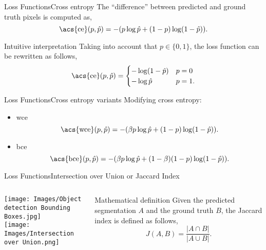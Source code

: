 \documentclass{beamer}
\begin{document}
\begin{frame}{Loss Functions}{Cross entropy}
  The ``difference'' between predicted and ground truth pixels is computed as,
  \begin{equation}
    \text{\acs{ce}}(p, \hat{p}) = -(p\log\hat{p} + (1 - p)\log(1 - \hat{p})).
  \end{equation}
  \begin{exampleblock}{Intuitive interpretation}
    Taking into account that \(p \in \{0, 1\}\), the loss function can be
    rewritten as follows,
    \begin{equation}
      \text{\acs{ce}}(p, \hat{p}) =
      \begin{cases}
        -\log(1 - \hat{p}) & p = 0 \\
        -\log\hat{p} & p = 1.
      \end{cases}
    \end{equation}
  \end{exampleblock}
\end{frame}

\begin{frame}{Loss Functions}{Cross entropy variants}
  Modifying cross entropy:
  \begin{itemize}
    \item \acf{wce}
    \begin{equation}
      \text{\acs{wce}}(p, \hat{p}) =
      -(\beta p\log\hat{p} + (1 - p)\log(1 - \hat{p})).
    \end{equation}
    \item \acf{bce}
    \begin{equation}
      \text{\acs{bce}}(p, \hat{p}) =
      -(\beta p\log\hat{p} + (1 - \beta)(1 - p)\log(1 - \hat{p})).
    \end{equation}
  \end{itemize}
\end{frame}

\begin{frame}{Loss Functions}{Intersection over Union or Jaccard Index}
  \begin{columns}
    \begin{column}{.5\textwidth}
      \centering
      \texttt{[image: Images/Object detection Bounding Boxes.jpg]}\\[1ex]
      \texttt{[image: Images/Intersection over Union.png]}
    \end{column}
    \begin{column}{.5\textwidth}
      \begin{block}{Mathematical definition}
        Given the predicted segmentation \(A\) and the ground truth \(B\), the
        Jaccard index is defined as follows,
        \begin{equation}
          J(A,B) = \frac{|A \cap B|}{|A \cup B|}.
        \end{equation}
      \end{block}
    \end{column}
  \end{columns}
\end{frame}
\end{document}
